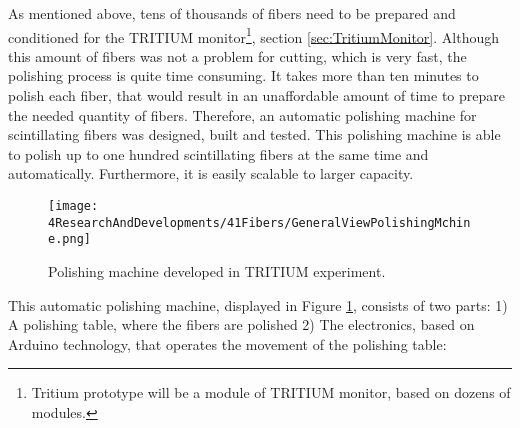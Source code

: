 As mentioned above, tens of thousands of fibers need to be prepared and conditioned for the TRITIUM monitor\footnote{Tritium prototype will be a module of TRITIUM monitor, based on dozens of modules.}, section \ref{sec:TritiumMonitor}. Although this amount of fibers was not a problem for cutting, which is very fast, the polishing process is quite time consuming. It takes more than ten minutes to polish each fiber, that would result in an unaffordable amount of time to prepare the needed quantity of fibers. Therefore, an automatic polishing machine for scintillating fibers was designed, built and tested. This polishing machine is able to polish up to one hundred scintillating fibers at the same time and automatically. Furthermore, it is easily scalable to larger capacity.


\begin{figure}[h]
\centering
\texttt{[image: 4ResearchAndDevelopments/41Fibers/GeneralViewPolishingMchine.png]}
\caption{Polishing machine developed in TRITIUM experiment.\label{fig:GeneralViewPolishingMachine}}
\end{figure}

This automatic polishing machine, displayed in Figure \ref{fig:GeneralViewPolishingMachine}, consists of two parts: 1) A polishing table, where the fibers are polished 2) The electronics, based on Arduino technology, that operates the movement of the polishing table:

